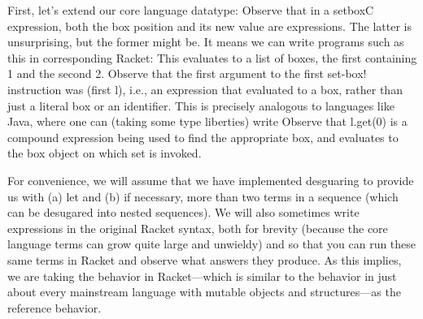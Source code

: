 First, let’s extend our core language datatype:
Observe that in a setboxC expression, both the box position and its new value
are expressions. The latter is unsurprising, but the former might be. It means
we can write programs such as this in corresponding Racket:
This evaluates to a list of boxes, the first containing 1 and the second 2.
Observe that the first argument to the first set-box! instruction was (first l),
i.e., an expression that evaluated to a box, rather than just a literal box or
an identifier. This is precisely analogous to languages like Java, where one can
(taking some type liberties) write
Observe that l.get(0) is a compound expression being used to find the
appropriate box, and evaluates to the box object on which set is invoked.

For convenience, we will assume that we have implemented desguaring to provide
us with (a) let and (b) if necessary, more than two terms in a sequence (which
can be desugared into nested sequences). We will also sometimes write
expressions in the original Racket syntax, both for brevity (because the core
language terms can grow quite large and unwieldy) and so that you can run these
same terms in Racket and observe what answers they produce. As this implies, we
are taking the behavior in Racket—which is similar to the behavior in just about
every mainstream language with mutable objects and structures—as the reference
behavior.

\secup

